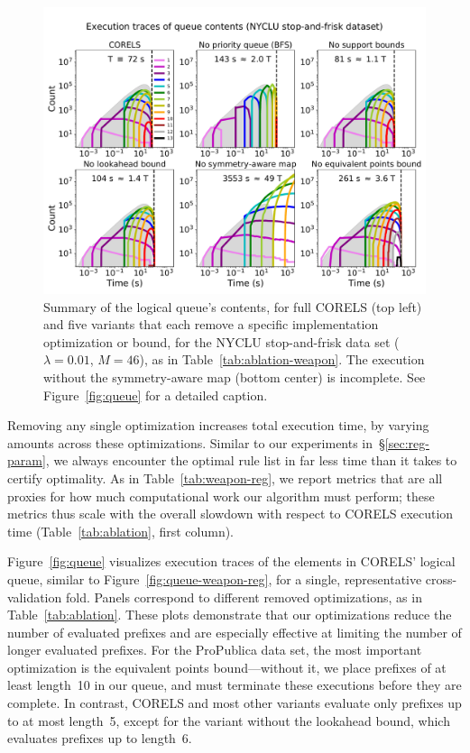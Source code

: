 \documentclass[twoside,11pt]{article}
\def\Reg{{\lambda}}
\begin{document}
%
\begin{figure}[t!]
\begin{center}
\includegraphics[trim={0mm 0mm 0mm 15mm}, width=\textwidth]{figs/weapon_ablation-queue.pdf}
\end{center}
\vspace{-5mm}
\caption{Summary of the logical queue's contents, for full CORELS (top left)
and five variants that each remove a specific implementation optimization or bound,
for the NYCLU stop-and-frisk data set (${\Reg = 0.01}$, ${M = 46}$), as in Table~\ref{tab:ablation-weapon}.
The execution without the symmetry-aware map (bottom center) is incomplete.
%
See Figure~\ref{fig:queue} for a detailed caption.
}
\label{fig:queue-weapon}
\end{figure}

Removing any single optimization increases total execution time,
by varying amounts across these optimizations.
%
Similar to our experiments in~\S\ref{sec:reg-param}, we always encounter the
optimal rule list in far less time than it takes to certify optimality.
%
As in Table~\ref{tab:weapon-reg}, we report metrics that are all proxies
for how much computational work our algorithm must perform;
these metrics thus scale with the overall slowdown with respect to CORELS execution time
(Table~\ref{tab:ablation}, first column).

Figure~\ref{fig:queue} visualizes execution traces of the elements in CORELS' logical queue,
similar to Figure~\ref{fig:queue-weapon-reg},
for a single, representative cross-validation fold.
%
Panels correspond to different removed optimizations, as in Table~\ref{tab:ablation}.
%
These plots demonstrate that our optimizations reduce the number of evaluated prefixes
and are especially effective at limiting the number of longer evaluated prefixes.
%
For the ProPublica data set, the most important optimization is the equivalent points
bound---without it, we place prefixes of at least length~10 in our queue,
and must terminate these executions before they are complete.
%
In contrast, CORELS and most other variants evaluate only prefixes up to at most length~5,
except for the variant without the lookahead bound, which evaluates prefixes up to length~6.
\end{document}
